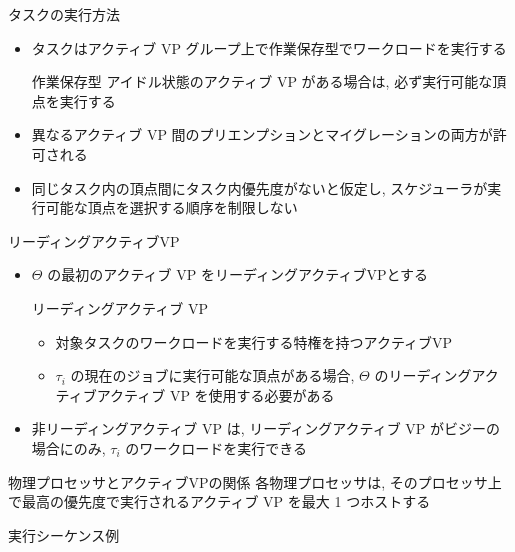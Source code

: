 \begin{frame}{タスクの実行方法}
    \begin{itemize}
        \item タスクはアクティブ VP グループ上で作業保存型でワークロードを実行する
              \begin{block}{作業保存型}
                  アイドル状態のアクティブ VP がある場合は, 必ず実行可能な頂点を実行する
              \end{block}
              \vspace{5mm}
        \item 異なるアクティブ VP 間のプリエンプションとマイグレーションの両方が許可される
        \item 同じタスク内の頂点間にタスク内優先度がないと仮定し, スケジューラが実行可能な頂点を選択する順序を制限しない
    \end{itemize}
\end{frame}

\begin{frame}{リーディングアクティブVP}
    \begin{itemize}
        \item $\Theta$ の最初のアクティブ VP をリーディングアクティブVPとする
              \begin{block}{リーディングアクティブ VP}
                  \begin{itemize}
                      \item 対象タスクのワークロードを実行する特権を持つアクティブVP
                      \item $\tau_{i}$ の現在のジョブに実行可能な頂点がある場合, $\Theta$ のリーディングアクティブアクティブ VP を使用する必要がある
                  \end{itemize}
              \end{block}
              \vspace{5mm}
        \item 非リーディングアクティブ VP は, リーディングアクティブ VP がビジーの場合にのみ, $\tau_{i}$ のワークロードを実行できる
    \end{itemize}
\end{frame}

\begin{frame}{物理プロセッサとアクティブVPの関係}
    各物理プロセッサは, そのプロセッサ上で最高の優先度で実行されるアクティブ VP を最大 1 つホストする
\end{frame}

\begin{frame}{実行シーケンス例}
\end{frame}

